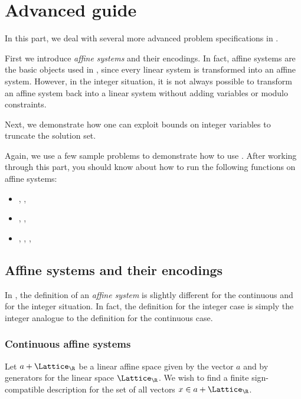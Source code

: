 %
%
%

\chapter{Advanced guide}

In this part, we deal with several more advanced problem
specifications in \FourTiTwo{}.

First we introduce \emph{affine systems} and their encodings. In
fact, affine systems are the basic objects used in \FourTiTwo{},
since every linear system is transformed into an affine system.
However, in the integer situation, it is not always possible to
transform an affine system back into a linear system without adding
variables or modulo constraints.

Next, we demonstrate how one can exploit bounds on integer variables
to truncate the solution set.

Again, we use a few sample problems to demonstrate how to use
\FourTiTwo{}. After working through this part, you should know about
how to run the following functions on affine systems:
\begin{itemize}
\item {}, , 
\item {}, , 
\item {}, , , 
\end{itemize}


\section{Affine systems and their encodings}

In \FourTiTwo, the definition of an \emph{affine system} is slightly
different for the continuous and for the integer situation. In fact,
the definition for the integer case is simply the integer analogue
to the definition for the continuous case.

\subsection{Continuous affine systems}

Let $a+\Lattice_{\R}$ be a linear affine space given by the vector
$a$ and by generators for the linear space $\Lattice_{\R}$. We wish
to find a finite sign-compatible description for the set of all
vectors $x\in a+\Lattice_{\R}$.

